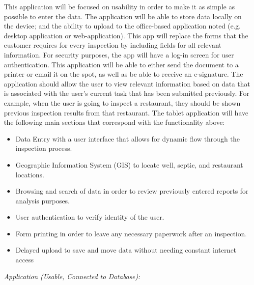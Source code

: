 \documentclass[twoside,letterpaper]{article}
\begin{document}
{This application will be focused on usability in order to make it as simple as possible to enter the data. The application will be able to store data locally on the device; and the ability to upload to the office-based application noted (e.g. desktop application or web-application). This app will replace the forms that the customer requires for every inspection by including fields for all relevant information. For security purposes, the app will have a log-in screen for user authentication. This application will be able to either send the document to a printer or email it on the spot, as well as be able to receive an e-signature. The application should allow the user to view relevant information based on data that is associated with the user's current task that has been submitted previously. For example, when the user is going to inspect a restaurant, they should be shown previous inspection results from that restaurant. 
\newline
\newline
The tablet application will have the following main sections that correspond with the functionality above: 
\begin{itemize}
\item{Data Entry with a user interface that allows for dynamic flow through the inspection process.}
\item{Geographic Information System (GIS) to locate well, septic, and restaurant locations.}
\item{Browsing and search of data in order to review previously entered reports for analysis purposes.}
\item{User authentication to verify identity of the user.}
\item{Form printing in order to leave any necessary paperwork after an inspection.}
\item{Delayed upload to save and move data without needing constant internet access}

\end{itemize}
\textit{Application (Usable, Connected to Database):}
\newline

}
\end{document}
